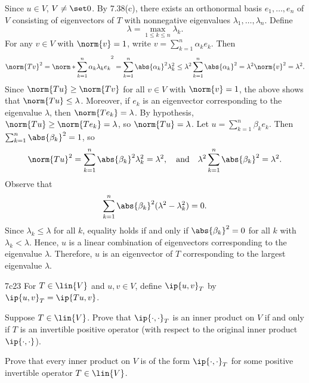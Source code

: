 \begin{sol}
    Since $u \in V$, $V \neq \set 0$.
    By 7.38(c), there exists an orthonormal basis $e_1, \ldots, e_n$ of $V$ consisting of eigenvectors of $T$ with nonnegative eigenvalues $\lambda_1, \ldots, \lambda_n$.
    Define
    \[
        \lambda = \max_{1 \leq k \leq n} \lambda_k.
    \]
    For any $v \in V$ with $\norm{v} = 1$, write $v = \sum_{k=1}^n \alpha_k e_k$.
    Then
    \[
        \norm{T v}^2 = \norm*{\sum_{k=1}^n \alpha_k \lambda_k e_k}^2 = \sum_{k=1}^n \abs{\alpha_k}^2 \lambda_k^2 \leq \lambda^2 \sum_{k=1}^n \abs{\alpha_k}^2 = \lambda^2 \norm{v}^2 = \lambda^2.
    \]
    Since $\norm{Tu} \geq \norm{Tv}$ for all $v \in V$ with $\norm{v} = 1$, the above shows that $\norm{Tu} \leq \lambda$.
    Moreover, if $e_k$ is an eigenvector corresponding to the eigenvalue $\lambda$, then $\norm{T e_k} = \lambda$.
    By hypothesis, $\norm{Tu} \geq \norm{T e_k} = \lambda$, so $\norm{Tu} = \lambda$.
    Let $u = \sum_{k=1}^n \beta_k e_k$.
    Then $\sum_{k=1}^n \abs{\beta_k}^2 = 1$, so
    \[
        \norm{Tu}^2 = \sum_{k=1}^n \abs{\beta_k}^2 \lambda_k^2 = \lambda^2, \quad \text{and} \quad \lambda^2 \sum_{k=1}^n \abs{\beta_k}^2 = \lambda^2.
    \]
    Observe that
    \[
        \sum_{k=1}^n \abs{\beta_k}^2 (\lambda^2 - \lambda_k^2) = 0.
    \]
    Since $\lambda_k \leq \lambda$ for all $k$, equality holds if and only if $\abs{\beta_k}^2 = 0$ for all $k$ with $\lambda_k < \lambda$.
    Hence, $u$ is a linear combination of eigenvectors corresponding to the eigenvalue $\lambda$.
    Therefore, $u$ is an eigenvector of $T$ corresponding to the largest eigenvalue $\lambda$.
\end{sol}

\begin{exercise}{7c23}
    For $T \in \lin{V}$ and $u, v \in V$, define $\ip{u, v}_T$ by $\ip{u, v}_T = \ip{Tu, v}$.
    \begin{subexercises}
        \item Suppose $T \in \lin{V}$.
        Prove that $\ip{\cdot, \cdot}_T$ is an inner product on $V$ if and only if $T$ is an invertible positive operator (with respect to the original inner product $\ip{\cdot, \cdot}$).
        \item Prove that every inner product on $V$ is of the form $\ip{\cdot, \cdot}_T$ for some positive invertible operator $T \in \lin{V}$.
    \end{subexercises}
\end{exercise}

